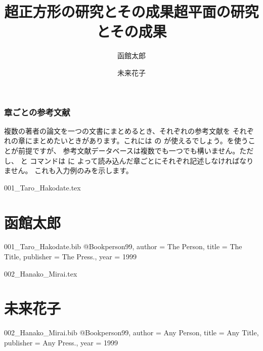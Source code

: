 \section{章ごとの参考文献\texorpdfstring{\zdash}{---}}
複数の著者の論文を一つの文書にまとめるとき、それぞれの参考文献を
それぞれの章にまとめたいときがあります。これには  
の  が使えるでしょう。\BibTeX を使うことが前提ですが、
参考文献データベースは複数でも一つでも構いません。ただし、
 と  コマンドは  に
よって読み込んだ章ごとにそれぞれ記述しなければなりません。
これも入力例のみを示します。

\begin{inputex}
\begin{filecontents*}{001_Taro_Hakodate.tex}
\part{函館太郎}
\author{函館太郎}
\title{超正方形の研究とその成果}
\maketitle
\nocite{person99}


\end{filecontents*}
\begin{filecontents*}{001_Taro_Hakodate.bib}
@Book{person99,
  author =	 {The Person},
  title = 	 {The Title},
  publisher = 	 {The Press.},
  year = 	 1999
}
\end{filecontents*}

\begin{filecontents*}{002_Hanako_Mirai.tex}
\part{未来花子}  
\author{未来花子}
\title{超平面の研究とその成果}
\maketitle
\nocite{person99}


\end{filecontents*}
\begin{filecontents*}{002_Hanako_Mirai.bib}
@Book{person99,
  author =	 {Any Person},
  title = 	 {Any Title},
 publisher = 	 {Any Press.},
  year = 	 1999
}
\end{filecontents*}


\end{inputex}
